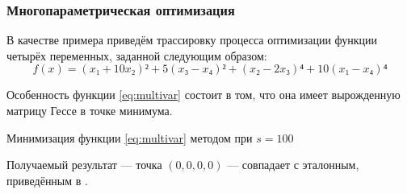 \subsubsection{Многопараметрическая оптимизация}

В качестве примера приведём трассировку процесса оптимизации функции
четырёх переменных, заданной следующим образом:
\begin{equation}
  \label{eq:multivar}
  f(x) = (x₁ + 10x₂)² + 5(x₃ - x₄)² + (x₂-2x₃)⁴+10(x₁-x₄)⁴
\end{equation}

Особенность функции \eqref{eq:multivar} состоит в том, что она имеет
вырожденную матрицу Гессе в точке минимума.

\begin{table}
  \centering
  
  \caption[\relch{} на функции четырёх переменных]{Минимизация функции \eqref{eq:multivar} методом \relch{} при $s=100$}
  \label{tab:multivar}
\end{table}

Получаемый результат — точка $(0,0,0,0)$ — совпадает с эталонным,
приведённым в \cite{himmelblau75}.
